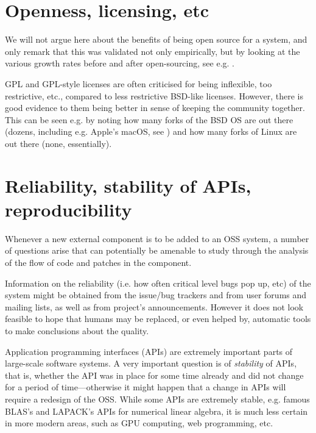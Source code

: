 \documentclass{deliverablereport}
\begin{document}
\section{Openness, licensing, etc}

We will not argue here about the benefits of being open source for a
system, and only remark that this was validated not only empirically,
but by looking at the various growth rates before and after
open-sourcing, see e.g. \cite{wp7:arfonshapeoss}.


GPL and GPL-style licenses \cite{wp7:gpl} are often criticised for being
inflexible, too restrictive, etc., compared to less restrictive BSD-like
licenses. However, there is good evidence
to them being better in sense of keeping the community together. This can be
seen e.g. by noting how many forks of the BSD OS are out there
(dozens, including e.g. Apple's macOS, see
\cite{wp7:bsdlist}) and how many forks of Linux are out there
(none, essentially). 

\section{Reliability, stability of APIs, reproducibility}
Whenever a new external component is to be added to an OSS system,
a number of questions arise that can potentially be amenable to study through the
analysis of the flow of code and patches in the component.

Information on the reliability (i.e. how often critical level
bugs pop up, etc) of the system might be obtained from the issue/bug
trackers and from user forums and mailing lists, as well as from project's
announcements. However it does not look feasible to hope that
humans may be replaced, or even helped by, automatic tools to
make conclusions about the quality.

Application programming interfaces (APIs) are extremely
important parts of large-scale software systems.
A very important question is of {\em stability} of APIs, that is,
whether the API was in place for some time already and did not change
for a period of time---otherwise it might happen that a change in APIs will
require a redesign of the OSS.
While some APIs are extremely stable, e.g. famous BLAS's and LAPACK's
\cite{2002:USB:567806.567807,Anderson:1990:LPL:110382.110385}
APIs for numerical linear algebra, it is much less certain in more
modern areas, such as GPU computing, web programming, etc.
\end{document}
